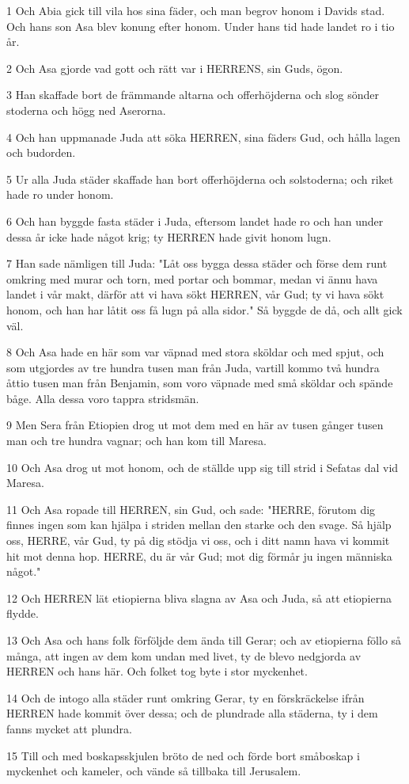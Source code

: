 \par 1 Och Abia gick till vila hos sina fäder, och man begrov honom i Davids stad. Och hans son Asa blev konung efter honom. Under hans tid hade landet ro i tio år.
\par 2 Och Asa gjorde vad gott och rätt var i HERRENS, sin Guds, ögon.
\par 3 Han skaffade bort de främmande altarna och offerhöjderna och slog sönder stoderna och högg ned Aserorna.
\par 4 Och han uppmanade Juda att söka HERREN, sina fäders Gud, och hålla lagen och budorden.
\par 5 Ur alla Juda städer skaffade han bort offerhöjderna och solstoderna; och riket hade ro under honom.
\par 6 Och han byggde fasta städer i Juda, eftersom landet hade ro och han under dessa år icke hade något krig; ty HERREN hade givit honom lugn.
\par 7 Han sade nämligen till Juda: "Låt oss bygga dessa städer och förse dem runt omkring med murar och torn, med portar och bommar, medan vi ännu hava landet i vår makt, därför att vi hava sökt HERREN, vår Gud; ty vi hava sökt honom, och han har låtit oss få lugn på alla sidor." Så byggde de då, och allt gick väl.
\par 8 Och Asa hade en här som var väpnad med stora sköldar och med spjut, och som utgjordes av tre hundra tusen man från Juda, vartill kommo två hundra åttio tusen man från Benjamin, som voro väpnade med små sköldar och spände båge. Alla dessa voro tappra stridsmän.
\par 9 Men Sera från Etiopien drog ut mot dem med en här av tusen gånger tusen man och tre hundra vagnar; och han kom till Maresa.
\par 10 Och Asa drog ut mot honom, och de ställde upp sig till strid i Sefatas dal vid Maresa.
\par 11 Och Asa ropade till HERREN, sin Gud, och sade: "HERRE, förutom dig finnes ingen som kan hjälpa i striden mellan den starke och den svage. Så hjälp oss, HERRE, vår Gud, ty på dig stödja vi oss, och i ditt namn hava vi kommit hit mot denna hop. HERRE, du är vår Gud; mot dig förmår ju ingen människa något."
\par 12 Och HERREN lät etiopierna bliva slagna av Asa och Juda, så att etiopierna flydde.
\par 13 Och Asa och hans folk förföljde dem ända till Gerar; och av etiopierna föllo så många, att ingen av dem kom undan med livet, ty de blevo nedgjorda av HERREN och hans här. Och folket tog byte i stor myckenhet.
\par 14 Och de intogo alla städer runt omkring Gerar, ty en förskräckelse ifrån HERREN hade kommit över dessa; och de plundrade alla städerna, ty i dem fanns mycket att plundra.
\par 15 Till och med boskapsskjulen bröto de ned och förde bort småboskap i myckenhet och kameler, och vände så tillbaka till Jerusalem.

